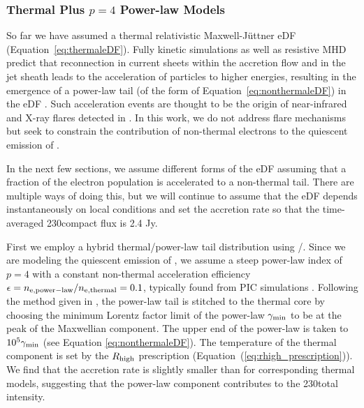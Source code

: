 \subsubsection{Thermal Plus \texorpdfstring{$p = 4$}{p=4} Power-law Models}

So far we have assumed a thermal relativistic Maxwell-J{\"u}ttner eDF (Equation~\ref{eq:thermaleDF}).
Fully kinetic simulations as well as resistive MHD predict that reconnection in current sheets within the accretion flow and in the jet sheath leads to the acceleration of particles to higher energies, resulting in the emergence of a power-law tail (of the form of Equation~\ref{eq:nonthermaleDF}) in the eDF \citep[e.g.,][and references therein]{Sironi2021}.
Such acceleration events are thought to be the origin of near-infrared and X-ray flares detected in \sgra.
In this work, we do not address flare mechanisms but seek to constrain the contribution of non-thermal electrons to the quiescent emission of \sgra.

In the next few sections, we assume different forms of the eDF assuming that a fraction of the electron population is accelerated to a non-thermal tail.
There are multiple ways of doing this, but we will continue to assume that the eDF depends instantaneously on local conditions and set the accretion rate so that the time-averaged 230\GHz compact flux is 2.4 Jy.

First we employ a hybrid thermal/power-law tail distribution using \hamr/\bhoss.
Since we are modeling the quiescent emission of \sgra, we assume a steep power-law index of $p=4$ with a constant non-thermal acceleration efficiency $\epsilon=n_{\rm e, power-law}/n_{\rm e, thermal}=0.1$, typically found from PIC simulations \citep[e.g.,][]{Sironi2015,Crumley2019}.
Following the method given in \citet{Chatterjee2021}, the power-law tail is stitched to the thermal core by choosing the minimum Lorentz factor limit of the power-law $\gamma_{\rm min}$ to be at the peak of the Maxwellian component.
The upper end of the power-law is taken to $10^5 \gamma_{\rm min}$ (see Equation \ref{eq:nonthermaleDF}).
The temperature of the thermal component is set by the $R_\mathrm{high}$ prescription (Equation~(\ref{eq:rhigh_prescription})).
We find that the accretion rate is slightly smaller than for corresponding thermal models, suggesting that the power-law component contributes to the 230\GHz total intensity.


